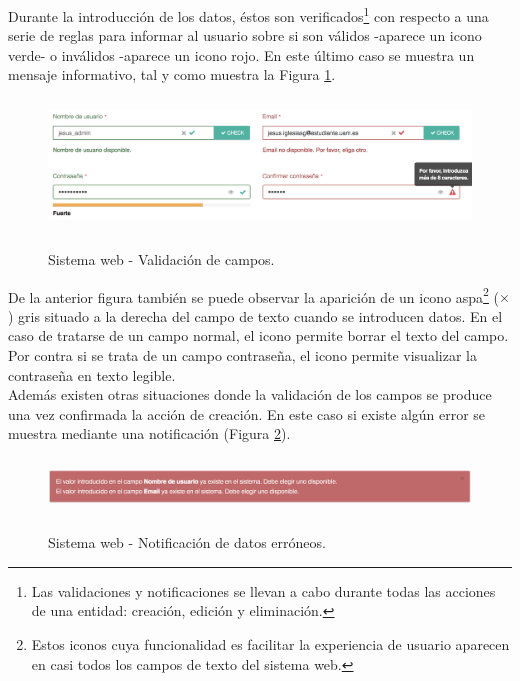\documentclass[12pt,a4paper, twoside]{report}
\begin{document}
\begin{itemize}
\begin{itemize}
			\newpage
			
			Durante la introducción de los datos, éstos son verificados\footnote{Las validaciones y notificaciones se llevan a cabo durante todas las acciones de una entidad: creación, edición y eliminación.} con respecto a una serie de reglas para informar al usuario sobre si son válidos -aparece un icono verde- o inválidos -aparece un icono rojo. En este último caso se muestra un mensaje informativo, tal y como muestra la Figura \ref{fig:web_adminCreateValidation}.
			
			\begin{figure}[!ht]   
				\caption{Sistema web - Validación de campos.} 
				\begin{center}
	 				\includegraphics[width=14cm, height=3.5cm]{Images/userGuide/web/adminCreateValidation} \\
	 				\label{fig:web_adminCreateValidation} 
				\end{center}  	
			\end{figure}
			
			De la anterior figura también se puede observar la aparición de un icono aspa\footnote{Estos iconos cuya funcionalidad es facilitar la experiencia de usuario aparecen en casi todos los campos de texto del sistema web.} ($\times$) gris situado a la derecha del campo de texto cuando se introducen datos. En el caso de tratarse de un campo normal, el icono permite borrar el texto del campo. Por contra si se trata de un campo contraseña, el icono permite visualizar la contraseña en texto legible. \\
			
			Además existen otras situaciones donde la validación de los campos se produce una vez confirmada la acción de creación. En este caso si existe algún error se muestra mediante una notificación (Figura \ref{fig:web_adminCreateError}).		
			
			\begin{figure}[!ht]   
				\caption{Sistema web - Notificación de datos erróneos.} 
				\begin{center}
	 				\includegraphics[width=14cm, height=1.5cm]{Images/userGuide/web/adminCreateError} \\
	 				\label{fig:web_adminCreateError} 
				\end{center}  	
			\end{figure}
			

\end{itemize}
\end{itemize}
\end{document}
